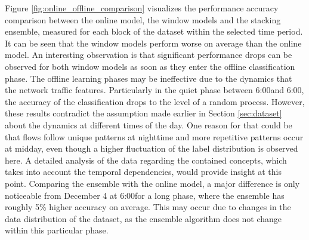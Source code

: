 \documentclass[conference]{IEEEtran}
\begin{document}
Figure \ref{fig:online_offline_comparison} visualizes the performance accuracy comparison between the online model, the window models and the stacking ensemble, measured for each block of the dataset within the selected time period. It can be seen that the window models perform worse on average than the online model. An interesting observation is that significant performance drops can be observed for both window models as soon as they enter the offline classification phase. The offline learning phases may be ineffective due to the dynamics that the network traffic features. Particularly in the quiet phase between 6:00\PM and 6:00\AM, the accuracy of the classification drops to the level of a random process. However, these results contradict the assumption made earlier in Section \ref{sec:dataset} about the dynamics at different times of the day. One reason for that could be that flows follow unique patterns at nighttime and more repetitive patterns occur at midday, even though a higher fluctuation of the label distribution is observed here. A detailed analysis of the data regarding the contained concepts, which takes into account the temporal dependencies, would provide insight at this point. Comparing the ensemble with the online model, a major difference is only noticeable from December 4 at 6:00\PM for a long phase, where the ensemble has roughly 5\% higher accuracy on average. This may occur due to changes in the data distribution of the dataset, as the ensemble algorithm does not change within this particular phase.
\end{document}
